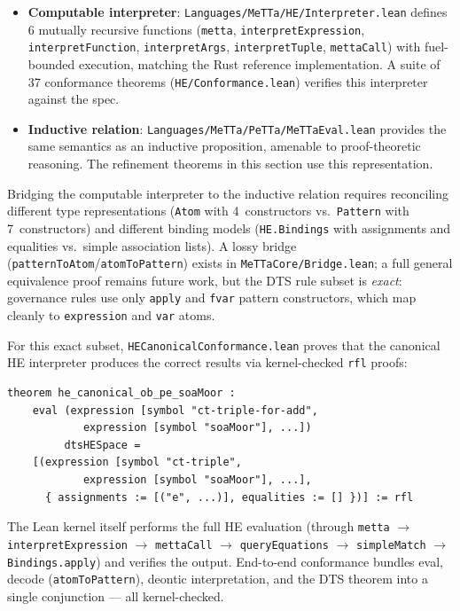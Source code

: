 \documentclass[]{article}
\newcommand{\code}[1]{\texttt{#1}}
\begin{document}
\begin{itemize}
\item \textbf{Computable interpreter}: \code{Languages/MeTTa/HE/Interpreter.lean}
      defines 6 mutually recursive functions (\code{metta},
      \code{interpretExpression}, \code{interpretFunction},
      \code{interpretArgs}, \code{interpretTuple}, \code{mettaCall})
      with fuel-bounded execution, matching the Rust reference implementation.
      A suite of 37 conformance theorems
      (\code{HE/Conformance.lean}) verifies this interpreter against the spec.
\item \textbf{Inductive relation}: \code{Languages/MeTTa/PeTTa/MeTTaEval.lean} provides
      the same semantics as an inductive proposition, amenable to
      proof-theoretic reasoning.  The refinement theorems in this section
      use this representation.
\end{itemize}

\noindent
Bridging the computable interpreter to the inductive relation requires
reconciling different type representations (\code{Atom} with 4~constructors
vs.\ \code{Pattern} with 7~constructors) and different binding models
(\code{HE.Bindings} with assignments and equalities vs.\ simple association
lists).  A lossy bridge (\code{patternToAtom}/\code{atomToPattern}) exists
in \code{MeTTaCore/Bridge.lean}; a full general equivalence proof remains
future work, but the DTS rule subset is \emph{exact}: governance rules
use only \code{apply} and \code{fvar} pattern constructors, which map
cleanly to \code{expression} and \code{var} atoms.

For this exact subset, \code{HECanonicalConformance.lean} proves that the
canonical HE interpreter produces the correct results via kernel-checked
\code{rfl} proofs:

\begin{lstlisting}
theorem he_canonical_ob_pe_soaMoor :
    eval (expression [symbol "ct-triple-for-add",
            expression [symbol "soaMoor"], ...])
         dtsHESpace =
    [(expression [symbol "ct-triple",
            expression [symbol "soaMoor"], ...],
      { assignments := [("e", ...)], equalities := [] })] := rfl
\end{lstlisting}

\noindent
The Lean kernel itself performs the full HE evaluation (through \code{metta}
$\to$ \code{interpretExpression} $\to$ \code{mettaCall} $\to$
\code{queryEquations} $\to$ \code{simpleMatch} $\to$ \code{Bindings.apply})
and verifies the output.  End-to-end conformance bundles eval, decode
(\code{atomToPattern}), deontic interpretation, and the DTS theorem into
a single conjunction --- all kernel-checked.
\end{document}

